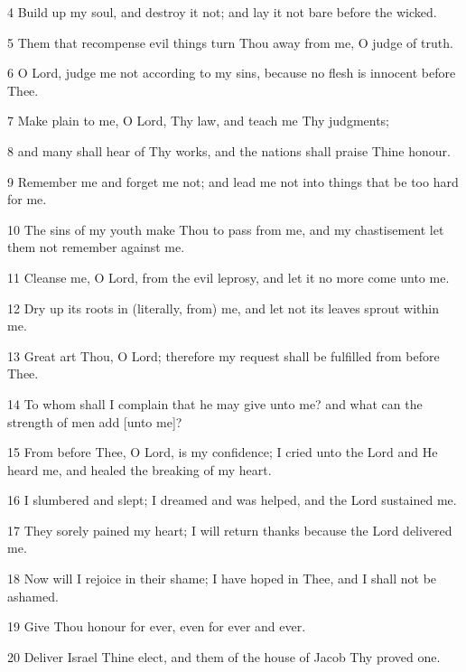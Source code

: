 \par 4 Build up my soul, and destroy it not; and lay it not bare before the wicked. 

\par 5 Them that recompense evil things turn Thou away from me, O judge of truth. 

\par 6 O Lord, judge me not according to my sins, because no flesh is innocent before Thee. 

\par 7 Make plain to me, O Lord, Thy law, and teach me Thy judgments; 

\par 8 and many shall hear of Thy works, and the nations shall praise Thine honour. 

\par 9 Remember me and forget me not; and lead me not into things that be too hard for me. 

\par 10 The sins of my youth make Thou to pass from me, and my chastisement let them not remember against me. 

\par 11 Cleanse me, O  Lord, from the evil leprosy, and let it no more come unto me. 

\par 12 Dry up its roots in (literally, from) me, and let not its leaves sprout within me. 

\par 13 Great art Thou, O Lord; therefore my request shall be fulfilled from before Thee. 

\par 14 To whom shall I  complain that he may give unto me? and what can the strength of men add [unto me]? 

\par 15 From before Thee, O Lord, is my confidence; I cried unto the Lord and He heard me, and healed the breaking of my heart. 

\par 16 I slumbered and slept; I dreamed and was helped, and the Lord sustained me. 

\par 17 They sorely pained my heart; I will return thanks because the Lord delivered me. 

\par 18 Now will I rejoice in their shame; I have hoped in Thee, and I shall not be ashamed. 

\par 19 Give Thou honour for ever, even for ever and ever. 

\par 20 Deliver Israel Thine elect, and them of the house of Jacob Thy proved one.

